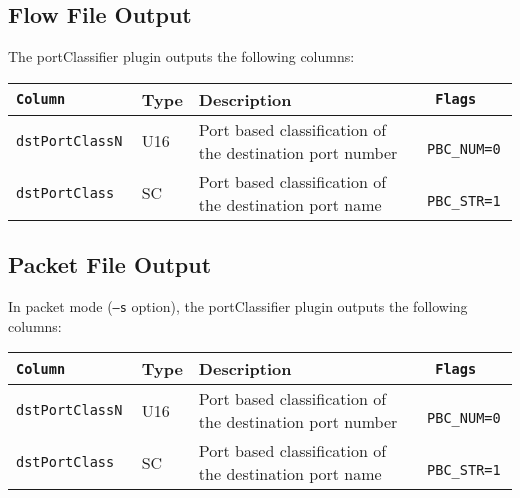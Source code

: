 \documentclass[documentation]{subfiles}
\begin{document}
\subsection{Flow File Output}
The portClassifier plugin outputs the following columns:
\begin{longtable}{>{\tt}lll>{\tt\small}l}
    \toprule
    {\bf Column} & {\bf Type} & {\bf Description} & {\bf Flags}\\
    \midrule\endhead%
    dstPortClassN & U16 & Port based classification of the destination port number & PBC\_NUM=0\\
    dstPortClass  & SC  & Port based classification of the destination port name   & PBC\_STR=1\\
    \bottomrule
\end{longtable}

\subsection{Packet File Output}
In packet mode ({\tt --s} option), the portClassifier plugin outputs the following columns:
\begin{longtable}{>{\tt}lll>{\tt\small}l}
    \toprule
    {\bf Column} & {\bf Type} & {\bf Description} & {\bf Flags}\\
    \midrule\endhead%
    dstPortClassN & U16 & Port based classification of the destination port number & PBC\_NUM=0\\
    dstPortClass  & SC  & Port based classification of the destination port name   & PBC\_STR=1\\
    \bottomrule
\end{longtable}
\end{document}
